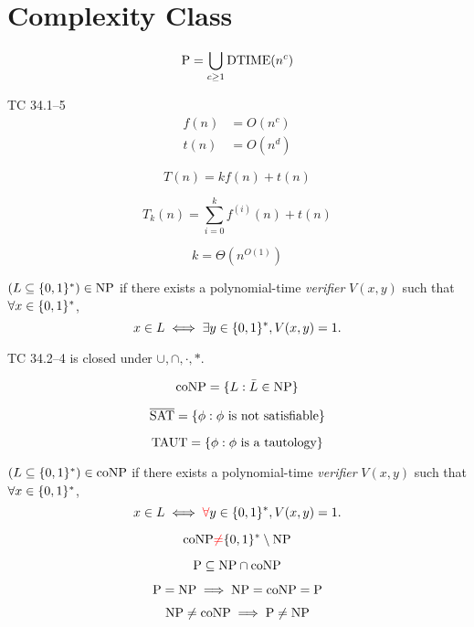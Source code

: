 \section{Complexity Class}

\begin{frame}{\p}
  \[
	\text{P} = \bigcup_{c \ge 1} \text{DTIME}(n^c)
  \]

  \begin{exampleblock}{TC 34.1--5}
	\begin{align*}
	  f(n) &= O(n^c) \\
	  t(n) &= O(n^d)
	\end{align*}
  \end{exampleblock}

  \[
	T(n) = kf(n) + t(n)
  \]

  \[
	T_{k}(n) = \sum_{i=0}^{k}f^{(i)}(n) + t(n) 
  \]

  \[
	k = \Theta(n^{O(1)})
  \]
\end{frame}
\begin{frame}{\np}
  \begin{definition}[\np]
	$(L \subseteq \{0,1\}^{\ast}) \in \text{NP}$ if there exists a polynomial-time \emph{verifier} $V(x,y)$ such that $\forall x \in \{0,1\}^{\ast}$,
	\[
	  x \in L \iff \exists y \in \{0,1\}^{\ast}, V(x,y) = 1.
	\]
  \end{definition}

  \begin{exampleblock}{TC 34.2--4}
	\np{} is closed under $\cup, \cap, \cdot, \ast$.
  \end{exampleblock}
\end{frame}
\begin{frame}{\conp{}}
  \[
	\text{coNP} = \{L: \bar{L} \in \text{NP}\}
  \]

  \[
	\overline{\text{SAT}} = \{\phi: \phi \text{ is not satisfiable}\}
  \]

  \[
	\text{TAUT} = \{\phi: \phi \text{ is a tautology}\}
  \]

  \begin{definition}[\conp]
	$(L \subseteq \{0,1\}^{\ast}) \in \text{coNP}$ if there exists a polynomial-time \emph{verifier} $V(x,y)$ such that $\forall x \in \{0,1\}^{\ast}$,
	\[
	  x \in L \iff \textcolor{red}{\forall} y \in \{0,1\}^{\ast}, V(x,y) = 1.
	\]
  \end{definition}
\end{frame}
\begin{frame}{\conp{}}
  \[
	\text{coNP}{} \textcolor{red}{\neq} \{0,1\}^{\ast} \setminus \text{NP}
  \]

  \[
	\text{P} \subseteq \text{NP} \cap \text{coNP}
  \]

  \[
	\text{P} = \text{NP} \implies \text{NP} = \text{coNP} = \text{P}
  \]

  \[
	\text{NP} \neq \text{coNP} \implies \text{P} \neq \text{NP}
  \]
\end{frame}
